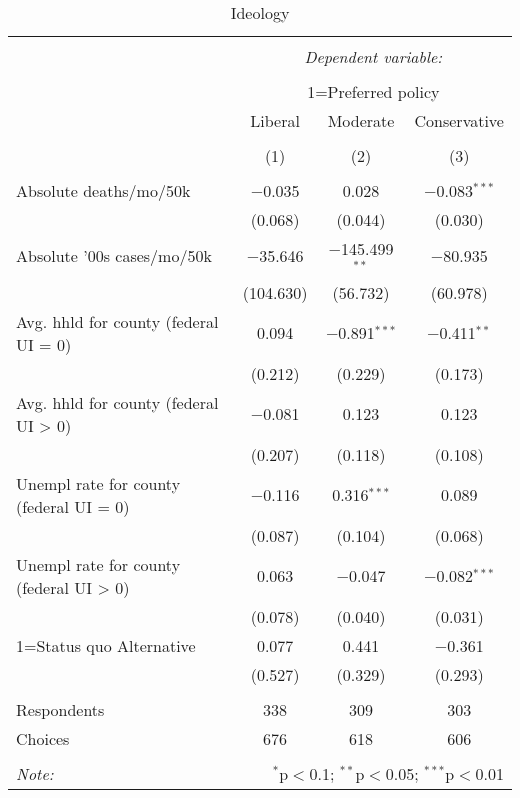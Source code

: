 
\begin{table}[!htbp] \centering 
  \caption{Ideology} 
  \label{} 
\begin{tabular}{@{\extracolsep{5pt}}lccc} 
\\[-1.8ex]\hline 
\hline \\[-1.8ex] 
 & \multicolumn{3}{c}{\textit{Dependent variable:}} \\ 
\cline{2-4} 
\\[-1.8ex] & \multicolumn{3}{c}{1=Preferred policy} \\ 
 & Liberal & Moderate & Conservative \\ 
\\[-1.8ex] & (1) & (2) & (3)\\ 
\hline \\[-1.8ex] 
 Absolute deaths/mo/50k & $-$0.035 & 0.028 & $-$0.083$^{***}$ \\ 
  & (0.068) & (0.044) & (0.030) \\ 
  Absolute '00s cases/mo/50k & $-$35.646 & $-$145.499$^{**}$ & $-$80.935 \\ 
  & (104.630) & (56.732) & (60.978) \\ 
  Avg. hhld  for county (federal UI = 0) & 0.094 & $-$0.891$^{***}$ & $-$0.411$^{**}$ \\ 
  & (0.212) & (0.229) & (0.173) \\ 
  Avg. hhld  for county (federal UI > 0) & $-$0.081 & 0.123 & 0.123 \\ 
  & (0.207) & (0.118) & (0.108) \\ 
  Unempl rate for county (federal UI = 0) & $-$0.116 & 0.316$^{***}$ & 0.089 \\ 
  & (0.087) & (0.104) & (0.068) \\ 
  Unempl rate for county (federal UI > 0) & 0.063 & $-$0.047 & $-$0.082$^{***}$ \\ 
  & (0.078) & (0.040) & (0.031) \\ 
  1=Status quo Alternative & 0.077 & 0.441 & $-$0.361 \\ 
  & (0.527) & (0.329) & (0.293) \\ 
 \hline \\[-1.8ex] 
Respondents & 338 & 309 & 303\\ 
 Choices & 676 & 618 & 606\\ 
\hline 
\hline \\[-1.8ex] 
\textit{Note:}  & \multicolumn{3}{r}{$^{*}$p$<$0.1; $^{**}$p$<$0.05; $^{***}$p$<$0.01} \\ 
\end{tabular} 
\end{table} 
